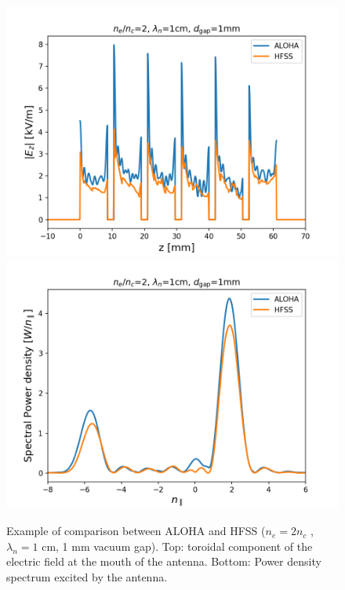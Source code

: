 \begin{figure}[h]
	\centering
	\includegraphics[width=1.0\linewidth]{figures/chap2/LHCD/LH_HFSS_vs_ALOHA_Ez}\\
	\includegraphics[width=1.0\linewidth]{figures/chap2/LHCD/LH_HFSS_vs_ALOHA_spectrum}
	\caption{Example of comparison between ALOHA and HFSS ($n_e = 2n_c$ , $\lambda_n=1$ cm, 1 mm vacuum gap).  Top: toroidal component of the electric field at the mouth of the antenna. Bottom: Power density spectrum excited by the antenna.}
	\label{fig:LH_fied_spectrum}
\end{figure}

